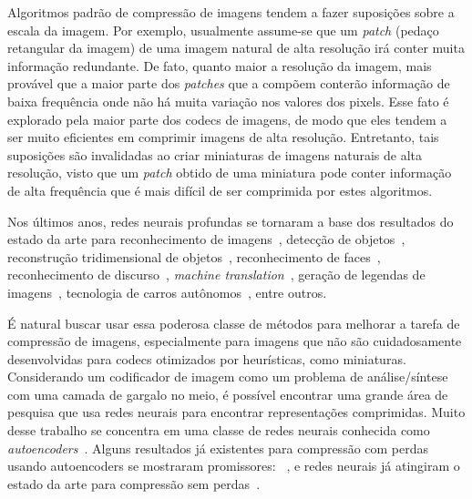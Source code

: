 Algoritmos padrão de compressão de imagens tendem a fazer suposições sobre a escala da imagem. Por exemplo, usualmente assume-se que um \textit{patch} (pedaço retangular da imagem) de uma imagem natural de alta resolução irá conter muita informação redundante. De fato, quanto maior a resolução da imagem, mais provável que a maior parte dos \textit{patches} que a compõem conterão informação de baixa frequência onde não há muita variação nos valores dos pixels. Esse fato é explorado pela maior parte dos codecs de imagens, de modo que eles tendem a ser muito eficientes em comprimir imagens de alta resolução. Entretanto, tais suposições são invalidadas ao criar miniaturas de imagens naturais de alta resolução, visto que um \textit{patch} obtido de uma miniatura pode conter informação de alta frequência que é mais difícil de ser comprimida por estes algoritmos.

Nos últimos anos, redes neurais profundas se tornaram a base dos resultados do estado da arte para reconhecimento de imagens~\cite{simonyan}, detecção de objetos~\cite{girshick2014rich}, reconstrução tridimensional de objetos~\cite{choy20163d}, reconhecimento de faces~\cite{deepface}, reconhecimento de discurso~\cite{graves}, \textit{machine translation}~\cite{sequence}, geração de legendas de imagens~\cite{vinyals2015show}, tecnologia de carros autônomos~\cite{huval2015empirical}, entre outros. 

É natural buscar usar essa poderosa classe de métodos para melhorar a tarefa de compressão de imagens, especialmente para imagens que não são cuidadosamente desenvolvidas para codecs otimizados por heurísticas, como miniaturas. Considerando um codificador de imagem como um problema de análise/síntese com uma camada de gargalo no meio, é possível encontrar uma grande área de pesquisa que usa redes neurais para encontrar representações comprimidas. Muito desse trabalho se concentra em uma classe de redes neurais conhecida como \emph{autoencoders}~\cite{autoencoder2011}. Alguns resultados já existentes para compressão com perdas usando autoencoders se mostraram promissores: ~\cite{gregor2016towards, FullResolution2017Toderici, Variable2016Toderici}, e redes neurais já atingiram o estado da arte para compressão sem perdas~\cite{mentzer2019, theis2015generative}. 
